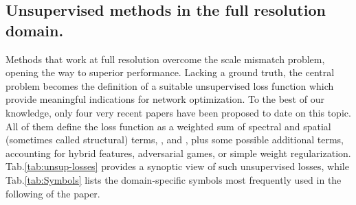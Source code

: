 \documentclass[journal]{IEEEtran}
\begin{document}
\subsection{Unsupervised methods in the full resolution domain.}
Methods that work at full resolution overcome the scale mismatch problem, opening the way to superior performance.
Lacking a ground truth,
the central problem becomes the definition of a suitable unsupervised loss function
which provide meaningful indications for network optimization.
To the best of our knowledge,
only four very recent papers \cite{Luo2020, Uezato2020, Ma2020, Ciotola2022} have been proposed to date on this topic.
All of them define the loss function as a weighted sum of spectral and spatial (sometimes called structural) terms, , and ,
plus some possible additional terms, accounting for hybrid features, adversarial games, or simple weight regularization.
Tab.\ref{tab:unsup-losses} provides a synoptic view of such unsupervised losses,
while Tab.\ref{tab:Symbols} lists the domain-specific symbols most frequently used in the following of the paper.


\newcommand{\myrule}[1]{{  }}
\newcommand{\myname}[1]{{ \begin{minipage}{18mm} \center{#1} \end{minipage} }}
\newcommand{\myspec}[1]{{ \begin{minipage}{45mm} \center{#1} \end{minipage} }}
\newcommand{\myspat}[1]{{ \begin{minipage}{36mm} \center{#1} \end{minipage} }}
\newcommand{\mynote}[1]{{ \begin{minipage}{54mm} {#1} \end{minipage} }}
\newcommand{\norm}[1]{{\left\| #1 \right\|}}
\end{document}
